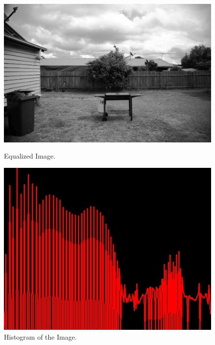 \begin{figure}[h]
	\centering
	\begin{minipage}{0.45\textwidth}
		\centering
		\includegraphics[width=\linewidth]{images/source/task5/1}
		\caption{Equalized Image.}
		\label{fig:5a}
        \end{minipage}
        \hspace{0.05\textwidth}
        \begin{minipage}{0.45\textwidth}
        		\centering
		\includegraphics[width=\linewidth]{images/source/task5/2}
		\caption{Histogram of the Image.}
		\label{fig:5b}
        \end{minipage}
\end{figure}




